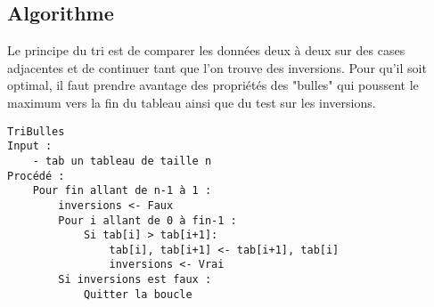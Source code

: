 \documentclass{../cours}
\begin{document}
\subsection{Algorithme}

Le principe du tri est de comparer les données deux à deux sur des cases adjacentes et de continuer tant que l'on trouve des inversions. Pour qu'il soit optimal, il faut prendre avantage des propriétés des "bulles" qui poussent le maximum vers la fin du tableau ainsi que du test sur les inversions.

\begin{lstlisting}
TriBulles
Input :
    - tab un tableau de taille n
Procédé :
    Pour fin allant de n-1 à 1 :
        inversions <- Faux
        Pour i allant de 0 à fin-1 :
            Si tab[i] > tab[i+1]:
                tab[i], tab[i+1] <- tab[i+1], tab[i]
                inversions <- Vrai
        Si inversions est faux :
            Quitter la boucle
\end{lstlisting}
\end{document}
